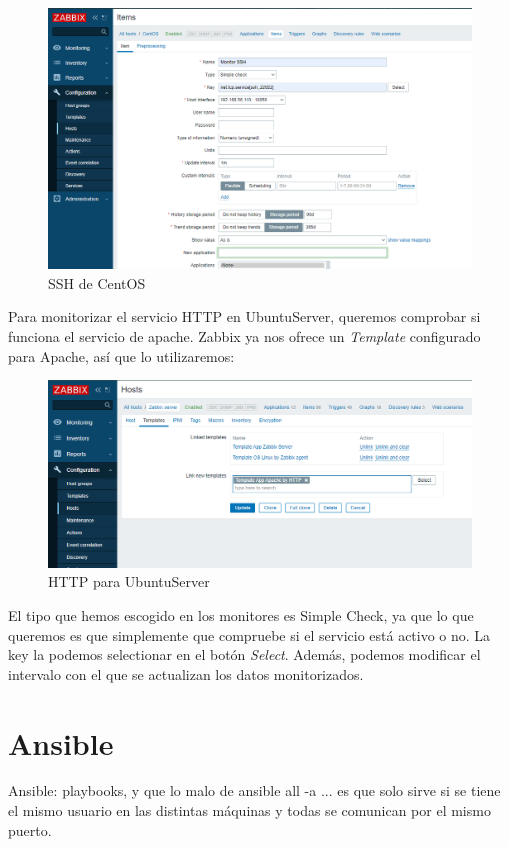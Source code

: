 \documentclass[a4paper]{article}
\begin{document}
\newpage
\begin{figure}
    \caption{SSH de CentOS}
    \includegraphics[width=\textwidth]{monitor ssh centos.png}
\end{figure}
Para monitorizar el servicio HTTP en UbuntuServer, queremos comprobar si funciona el servicio de apache.
Zabbix ya nos ofrece un \textsl{Template} configurado para Apache, así que lo utilizaremos:
\begin{figure}[hbt!]
    \caption{HTTP para UbuntuServer}
    \includegraphics[width=\textwidth]{http para ubunut.png}
\end{figure}
El tipo que hemos escogido en los monitores es Simple Check, ya que lo que queremos es que simplemente
que compruebe si el servicio está activo o no. La key la podemos selectionar en el botón \textsl{Select}.
Además, podemos modificar el intervalo con el que se actualizan los datos monitorizados.
\section{Ansible}
Ansible: playbooks, y que lo malo de ansible all -a ... es que solo sirve si se tiene 
el mismo usuario en las distintas máquinas y todas se comunican por el mismo puerto.
\end{document}

